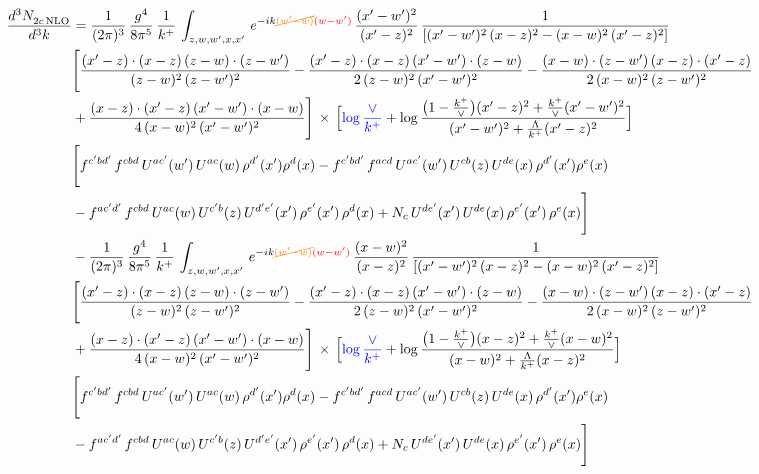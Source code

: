 \documentclass[9pt]{article}
\numberwithin{equation}{section}
\begin{document}
\begin{align}
    \frac{d^{3}N_{2c\,\rm NLO}^{\rm}}{d^{3}k}  & = \frac{1}{(2\pi)^{3}}\, \frac{g^{4}}{8\pi^{5}}\,\frac{1}{k^{+}}\,\int_{z,w,w^{\prime},x,x'}\, e^{-ik{\color{orange}\cancel{(w^{\prime}-w)}}{\color{red}(w-w^{\prime})}}\,\frac{(x'-w')^{2}}{(x'-z)^{2}}\, \frac{1}{\left[(x'-w')^{2}\, (x-z)^{2} - (x-w)^{2}\, (x'-z)^{2}\right]} \notag \\ & \Bigg[\frac{(x'-z)\cdot (x-z)\, (z-w)\cdot (z-w')}{(z-w)^{2}\, (z-w')^{2}}-\frac{(x'-z)\cdot (x-z)\, (x'-w')\cdot (z-w)}{2\, (z-w)^{2}\, (x'-w')^{2}} -\frac{(x-w)\cdot (z-w')\, (x-z)\cdot (x'-z)}{2\, (x-w)^{2}\, (z-w')^{2}}\notag \\ & +\frac{(x-z)\cdot (x'-z)\, (x'-w')\cdot (x-w)}{4\, (x-w)^{2}\, (x'-w')^{2}}\Bigg]\,\times\, \Big[{\color{blue}\log\frac{\vee}{k^{+}}}+\log\frac{\big(1-\frac{k^{+}}{\vee}\big)(x'-z)^{2}+\frac{k^{+}}{\vee}(x'-w')^{2}}{(x'-w')^{2}+\frac{\Lambda}{k^{+}}(x'-z)^{2}}\Big] \notag \\ &  \Bigg[f^{c'bd'}\,f^{cbd}\, U^{ac'}(w')\,U^{ac}(w)\,\rho^{d'}(x')\rho^{d}(x)- f^{c'bd'}\,f^{acd}\,U^{ac'}(w')\,U^{cb}(z)\,U^{de}(x)\,\rho^{d'}(x')\rho^{e}(x) \notag \\ & -f^{ac'd'}\,f^{cbd}\,U^{ac}(w)\,U^{c'b}(z)\,U^{d'e'}(x')\,\rho^{e'}(x')\,\rho^{d}(x) +N_{c}\,U^{de'}(x')\,U^{de}(x)\,\rho^{e'}(x')\,\rho^{e}(x)\Bigg]\notag \\ & -\frac{1}{(2\pi)^{3}}\, \frac{g^{4}}{8\pi^{5}}\,\frac{1}{k^{+}}\,\int_{z,w,w^{\prime},x,x'}\, e^{-ik{\color{orange}\cancel{(w^{\prime}-w)}}{\color{red}(w-w^{\prime})}}\,\frac{(x-w)^{2}}{(x-z)^{2}}\, \frac{1}{\left[(x'-w')^{2}\, (x-z)^{2} - (x-w)^{2}\, (x'-z)^{2}\right]} \notag \\ & \Bigg[\frac{(x'-z)\cdot (x-z)\, (z-w)\cdot (z-w')}{(z-w)^{2}\, (z-w')^{2}}-\frac{(x'-z)\cdot (x-z)\, (x'-w')\cdot (z-w)}{2\, (z-w)^{2}\, (x'-w')^{2}} -\frac{(x-w)\cdot (z-w')\, (x-z)\cdot (x'-z)}{2\, (x-w)^{2}\, (z-w')^{2}}\notag \\ & +\frac{(x-z)\cdot (x'-z)\, (x'-w')\cdot (x-w)}{4\, (x-w)^{2}\, (x'-w')^{2}}\Bigg]\,\times\, \Big[{\color{blue}\log\frac{\vee}{k^{+}}}+\log\frac{\big(1-\frac{k^{+}}{\vee}\big)(x-z)^{2}+\frac{k^{+}}{\vee}(x-w)^{2}}{(x-w)^{2}+\frac{\Lambda}{k^{+}}(x-z)^{2}}\Big] \notag \\ &  \Bigg[f^{c'bd'}\,f^{cbd}\, U^{ac'}(w')\,U^{ac}(w)\,\rho^{d'}(x')\rho^{d}(x)- f^{c'bd'}\,f^{acd}\,U^{ac'}(w')\,U^{cb}(z)\,U^{de}(x)\,\rho^{d'}(x')\rho^{e}(x) \notag \\ & -f^{ac'd'}\,f^{cbd}\,U^{ac}(w)\,U^{c'b}(z)\,U^{d'e'}(x')\,\rho^{e'}(x')\,\rho^{d}(x) +N_{c}\,U^{de'}(x')\,U^{de}(x)\,\rho^{e'}(x')\,\rho^{e}(x)\Bigg]
\end{align}
\end{document}
